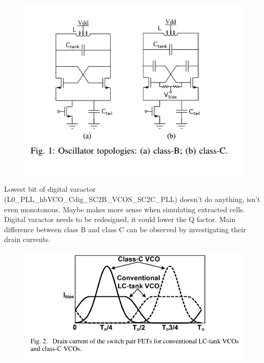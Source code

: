 \documentclass{article}
\begin{document}
\begin{figure}[ht!]
	\includegraphics[width=\linewidth]{Figures/class_C_vs_class_B.png}
	\label{fig:classC_classB}
\end{figure}

Lowest bit of digital varactor (L0\_PLL\_hbVCO\_Cdig\_SC2B\_VCOS\_SC2C\_PLL) doesn't do anything, isn't even monotonous. Maybe makes more sense when simulating extracted cells. Digital varactor needs to be redesigned, it could lower the Q factor.
Main difference between class B and class C can be observed by investigating their drain currents.

\begin{figure}[ht!]
	\includegraphics[width=\linewidth]{Figures/drainCurrent_classB_vs_classC.png}
	\label{fig:drainCurrent_classB_vs_classC}
\end{figure}
\end{document}
